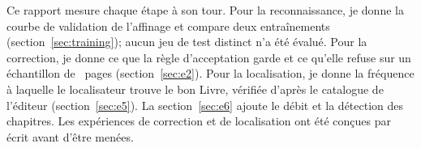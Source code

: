Ce rapport mesure chaque étape à son tour. Pour la reconnaissance, je donne la
courbe de validation de l'affinage et compare deux entraînements
(section~\ref{sec:training}); aucun jeu de test distinct n'a été évalué. Pour
la correction, je donne ce que la règle d'acceptation garde et ce qu'elle
refuse sur un échantillon de \corrPages{}~pages (section~\ref{sec:e2}). Pour la
localisation, je donne la fréquence à laquelle le localisateur trouve le bon
Livre, vérifiée d'après le catalogue de l'éditeur (section~\ref{sec:e5}). La
section~\ref{sec:e6} ajoute le débit et la détection des chapitres. Les
expériences de correction et de localisation ont été conçues par écrit avant
d'être menées.

